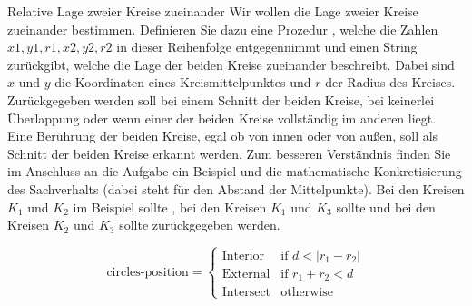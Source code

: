 \documentclass{../preamble}
\begin{document}
	\clearpage
	
	\begin{task}[credit = \stars{1}{3}]{Relative Lage zweier Kreise zueinander}
	    Wir wollen die Lage zweier Kreise zueinander bestimmen. Definieren Sie dazu eine Prozedur , welche die Zahlen \(x1, y1, r1, x2, y2, r2\) in dieser Reihenfolge entgegennimmt und einen String zurückgibt, welche die Lage der beiden Kreise zueinander beschreibt. Dabei sind \(x\) und \(y\) die Koordinaten eines Kreismittelpunktes und \(r\) der Radius des Kreises.
	    \br
	    Zurückgegeben werden soll  bei einem Schnitt der beiden Kreise,  bei keinerlei Überlappung oder  wenn einer der beiden Kreise vollständig im anderen liegt. Eine Berührung der beiden Kreise, egal ob von innen oder von außen, soll als Schnitt der beiden Kreise erkannt werden.
	    \br
	    Zum besseren Verständnis finden Sie im Anschluss an die Aufgabe ein Beispiel und die mathematische Konkretisierung des  Sachverhalts (dabei steht  für den Abstand der Mittelpunkte). Bei den Kreisen \(K_1\) und \(K_2\) im Beispiel sollte , bei den Kreisen \(K_1\) und \(K_3\) sollte  und bei den Kreisen \(K_2\) und \(K_3\) sollte  zurückgegeben werden.
	
	    \begin{minipage}{0.45 \linewidth}
	    	\begin{figure}[H]
	    		        \centering
	    	\end{figure}
	    \end{minipage}
	    \begin{minipage}{0.45 \linewidth}
	        \begin{equation*}
	            \text{circles-position} =
	            \begin{cases}
	                \text{Interior}  & \text{if } d < \vert r_1 - r_2 \vert
	                \\
	                \text{External}  & \text{if } r_1 + r_2 < d
	                \\
	                \text{Intersect} & \text{otherwise}
	            \end{cases}
	        \end{equation*}
	    \end{minipage}
	

\end{task}
\end{document}
